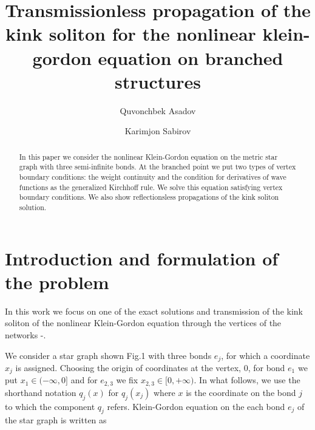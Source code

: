 \documentclass[12pt]{llncs}
\begin{document}
%

\fi


\title{Transmissionless propagation of the kink soliton for the nonlinear klein-gordon equation on branched structures}
\author{Quvonchbek Asadov \and  Karimjon Sabirov
}

\maketitle

\begin{abstract}

In this paper we consider the nonlinear Klein-Gordon equation on
the metric star graph with three semi-infinite bonds. At the
branched point we put two types of vertex boundary conditions: the
weight continuity and the condition for derivatives of wave
functions as the generalized Kirchhoff rule. We solve this
equation satisfying vertex boundary conditions. We also show reflectionsless
propagations of the kink soliton solution.


\end{abstract}


\section{Introduction and formulation of the problem}

In this work we focus on one of the exact solutions and
transmission of the kink soliton of the nonlinear Klein-Gordon
equation \cite{Book1} through the vertices of the networks \cite{Book2} -\cite{Article5}.

We consider a star graph shown Fig.1 with three bonds $e_j$, for which a
coordinate $x_j$ is assigned. Choosing the origin of coordinates
at the vertex, 0, for bond $e_1$ we put $x_1\in(-\infty,0]$ and
for $e_{2,3}$ we fix $x_{2,3}\in[0,+\infty)$. In what follows, we use the shorthand notation $q_{j}(x)$ for $q_j(x_j)$ where $x$ is the coordinate on the bond $j$ to which the component $q_j$ refers. Klein-Gordon equation on the each bond $e_j$ of the star graph is written as
\end{document}
